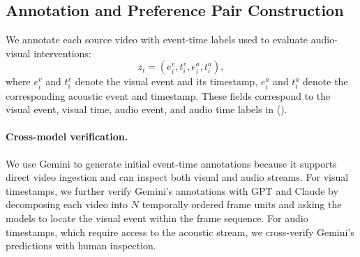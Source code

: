 


\subsection{Annotation and Preference Pair Construction}
\label{sec:AAPC}

We annotate each source video with event-time labels used to evaluate audio-visual interventions:
\begin{equation}
    z_i = (e_i^v, t_i^v, e_i^a, t_i^a),
\end{equation}
where $e_i^v$ and $t_i^v$ denote the visual event and its timestamp, $e_i^a$ and $t_i^a$ denote the corresponding acoustic event and timestamp. These fields correspond to the visual event, visual time, audio event, and audio time labels in  ().

\paragraph{Cross-model verification.}
We use Gemini to generate initial event-time annotations because it supports direct video ingestion and can inspect both visual and audio streams. For visual timestamps, we further verify Gemini's annotations with GPT and Claude by decomposing each video into $N$ temporally ordered frame units and asking the models to locate the visual event within the frame sequence. For audio timestamps, which require access to the acoustic stream, we cross-verify Gemini's predictions with human inspection.

